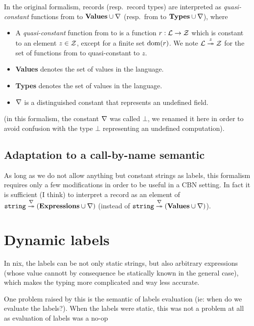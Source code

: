 In the original formalism, records (resp.\ record types) are interpreted as
\emph{quasi-constant} functions from  to $\textbf{Values} \cup
\nabla$ (resp.\ from  to $\textbf{Types} \cup \nabla$), where
\begin{itemize}
  \item A \emph{quasi-constant} function from  to  is a
    function $r: \mathcal{L} \rightarrow \mathcal{Z}$ which is constant to an element
    $z \in \mathcal{Z}$, except for a finite set $\operatorname{dom}(r)$. We note $\mathcal{L}
    \overset{z}{\twoheadrightarrow} \mathcal{Z}$ for the set of functions from  to 
    quasi-constant to $z$.
  \item \textbf{Values} denotes the set of values in the language.
  \item \textbf{Types} denotes the set of values in the language.
  \item $\nabla$ is a distinguished constant that represents an undefined
    field.
\end{itemize}

(in this formalism, the constant $\nabla$ was called $\bot$, we renamed it here
in order to avoid confusion with the type $\bot$ representing an undefined
computation).

\subsection{Adaptation to a call-by-name semantic}

As long as we do not allow anything but constant strings as labels, this
formalism requires only a few modifications in order to be useful in a CBN
setting. In fact it is sufficient (I think) to interpret a record as an element
of $\texttt{string} \overset{\nabla}{\twoheadrightarrow} \left(\textbf{Expressions} \cup
\nabla\right)$ (instead of $\texttt{string} \overset{\nabla}{\twoheadrightarrow}
\left(\textbf{Values} \cup \nabla\right)$).

\section{Dynamic labels}

In nix, the labels can be not only static strings, but also arbitrary
expressions (whose value cannott by consequence be statically known in the
general case), which makes the typing more complicated and way less accurate.

One problem raised by this is the semantic of labels evaluation (ie: when do we
evaluate the labels?). When the labels were static, this was not a problem at
all as evaluation of labels was a no-op

